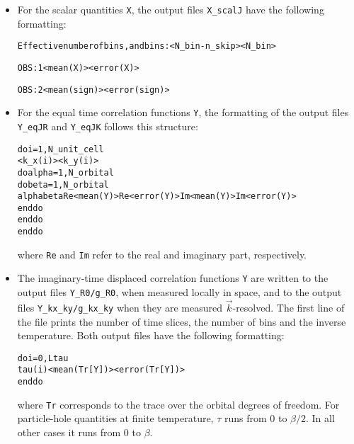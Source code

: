 \begin{itemize}
\item For the scalar quantities \texttt{X}, the output files  \texttt{X\_scalJ} have the following formatting:
\begin{alltt}
Effective number of bins, and bins:           <N_bin - n_skip>          <N_bin>

OBS :    1      <mean(X)>      <error(X)>

OBS :    2      <mean(sign)>   <error(sign)>
\end{alltt}

\item For the equal time correlation functions \texttt{Y}, the formatting of the output files \texttt{Y\_eqJR} and \texttt{Y\_eqJK} follows this structure:
\begin{alltt}
do i = 1, N_unit_cell
   <k_x(i)>   <k_y(i)>
   do alpha = 1, N_orbital
   do beta  = 1, N_orbital
      alpha   beta   Re<mean(Y)>   Re<error(Y)>   Im<mean(Y)>   Im<error(Y)>
   enddo
   enddo
enddo
\end{alltt}
where \texttt{Re} and \texttt{Im} refer to the real and imaginary part, respectively.

\item The imaginary-time displaced correlation functions \texttt{Y} are written to the output files \texttt{Y\_R0/g\_R0}, when measured locally in space, 
and to the output files \texttt{Y\_kx\_ky/g\_kx\_ky} when they are measured $\vec{k}$-resolved.    The first line of the  file prints the number of time slices, 
 the number of bins and the inverse temperature. 
Both output files have the following formatting:
\begin{alltt}
do i = 0, Ltau
   tau(i)   <mean( Tr[Y] )>   <error( Tr[Y])>
enddo
\end{alltt}
where \texttt{Tr} corresponds to the trace over the orbital degrees of freedom.   For particle-hole quantities at finite temperature,  $\tau$ runs from 
$0$ to $\beta/2$.   In all other cases it runs from $0$ to $\beta$. 


\end{itemize}
